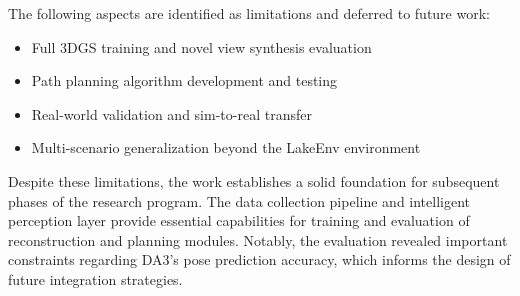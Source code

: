 The following aspects are identified as limitations and deferred to future work:

\begin{itemize}
    \item Full 3DGS training and novel view synthesis evaluation
    \item Path planning algorithm development and testing
    \item Real-world validation and sim-to-real transfer
    \item Multi-scenario generalization beyond the LakeEnv environment
\end{itemize}

Despite these limitations, the work establishes a solid foundation for subsequent phases of the research program. The data collection pipeline and intelligent perception layer provide essential capabilities for training and evaluation of reconstruction and planning modules. Notably, the evaluation revealed important constraints regarding DA3's pose prediction accuracy, which informs the design of future integration strategies.
